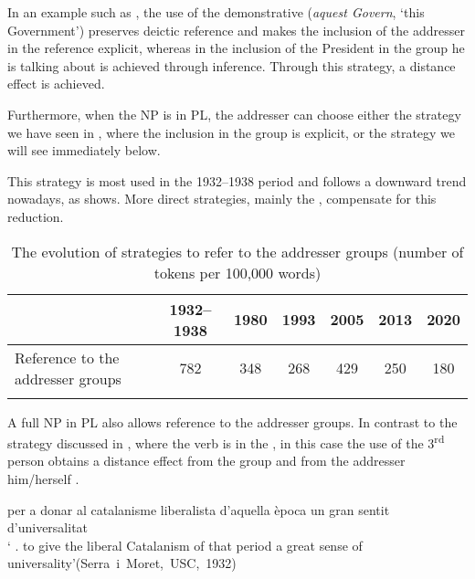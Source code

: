 \documentclass[output=paper]{langscibook}
\begin{document}
In an example such as , the use of the demonstrative (\textit{aquest Govern}, ‘this Government’) preserves deictic reference and makes the inclusion of the addresser in the reference explicit, whereas in  the inclusion of the President in the group he is talking about is achieved through inference. Through this strategy, a distance effect is achieved.



Furthermore, when the NP is in PL, the addresser can choose either the strategy we have seen in , where the inclusion in the group is explicit, or the strategy we will see immediately below.



This strategy is most used in the 1932–1938 period and follows a downward trend nowadays, as  shows. More direct strategies, mainly the , compensate for this reduction.


\begin{table}
\begin{tabularx}{\textwidth}{Q cccccc}
\lsptoprule
										& 1932--1938 & 1980 & 1993 & 2005 & 2013 & 2020\\
\midrule
Reference to the addresser groups & 782 & 348 & 268 & 429 & 250 & 180\\
\lspbottomrule
\end{tabularx}
\caption{The evolution of  strategies to refer to the addresser groups (number of tokens per 100,000 words)}
\label{tab:nogue:5}
\end{table}

\label{sec:nogue:2.1.2.4}

A full NP in PL also allows reference to the addresser groups. In contrast to the strategy discussed in , where the verb is in the , in this case the use of the 3\textsuperscript{rd} person obtains a distance effect from the group and from the addresser him/herself .

\ea\label{ex:nogue:15}
 \ea\label{ex:nogue:15a}

{ {per a donar al catalanisme liberalista d’aquella època un gran sentit d’universalitat}}\\
\glt `       \ExHighlight{[{lit}}. \ExHighlight{this]}      to give the liberal Catalanism of that period a great sense of universality'\hfill\hbox{(Serra i Moret, USC, 1932)}\\
\end{document}

